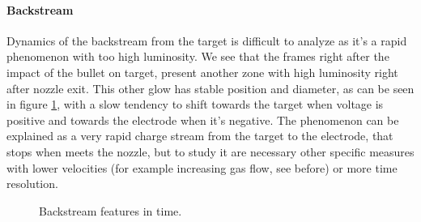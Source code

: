 \paragraph{Backstream}
Dynamics of the backstream from the target is difficult to analyze as it's a rapid phenomenon with too high luminosity. We see that the frames right after the impact of the bullet on target, present another zone with high luminosity right after nozzle exit. This other glow has stable position and diameter, as can be seen in figure \ref{fig:elio_a_back}, with a slow tendency to shift towards the target when voltage is positive and towards the electrode when it's negative.
The phenomenon can be explained as a very rapid charge stream from the target to the electrode, that stops when meets the nozzle, but to study it are necessary other specific measures with lower velocities (for example increasing gas flow, see before) or more time resolution.
\begin{figure}
 \centering
 \hfill
 
 \hfill
 \caption{Backstream features in time.}
 \label{fig:elio_a_back}
\end{figure}


